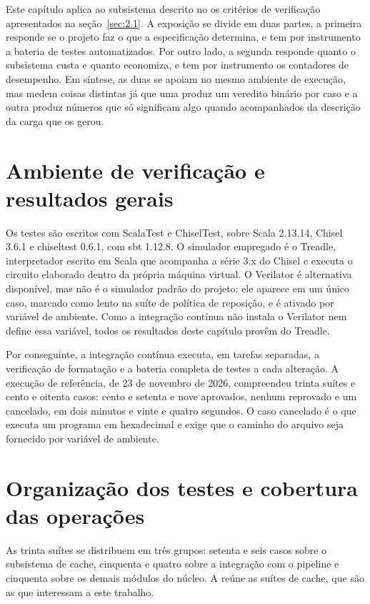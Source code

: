 Este capítulo aplica ao subsistema descrito no  os critérios de verificação apresentados na seção~\ref{sec:2.1}. A exposição se divide em duas partes, a primeira responde se o projeto faz o que a especificação determina, e tem por instrumento a bateria de testes automatizados. Por outro lado, a segunda responde quanto o subsistema custa e quanto economiza, e tem por instrumento os contadores de desempenho. Em síntese, as duas se apoiam no mesmo ambiente de execução, mas medem coisas distintas já que uma produz um veredito binário por caso e a outra produz números que só significam algo quando acompanhados da descrição da carga que os gerou.

\section{Ambiente de verificação e resultados gerais}\label{sec:4.1}

Os testes são escritos com ScalaTest e ChiselTest, sobre Scala 2.13.14, Chisel 3.6.1 e chiseltest 0.6.1, com sbt 1.12.8. O simulador empregado é o Treadle, interpretador escrito em Scala que acompanha a série 3.x do Chisel e executa o circuito elaborado dentro da própria máquina virtual. O Verilator é alternativa disponível, mas não é o simulador padrão do projeto: ele aparece em um único caso, marcado como lento na suíte de política de reposição, e é ativado por variável de ambiente. Como a integração contínua não instala o Verilator nem define essa variável, todos os resultados deste capítulo provêm do Treadle.

Por conseguinte, a integração contínua executa, em tarefas separadas, a verificação de formatação e a bateria completa de testes a cada alteração. A execução de referência, de 23 de novembro de 2026, compreendeu trinta suítes e cento e oitenta casos: cento e setenta e nove aprovados, nenhum reprovado e um cancelado, em dois minutos e vinte e quatro segundos. O caso cancelado é o que executa um programa em hexadecimal e exige que o caminho do arquivo seja fornecido por variável de ambiente.

\section{Organização dos testes e cobertura das operações}\label{sec:4.2}

As trinta suítes se distribuem em três grupos: setenta e seis casos sobre o subsistema de cache, cinquenta e quatro sobre a integração com o pipeline e cinquenta sobre os demais módulos do núcleo. A  reúne as suítes de cache, que são as que interessam a este trabalho.

